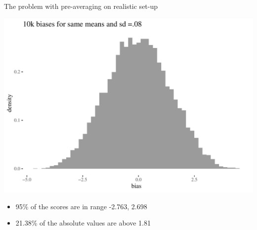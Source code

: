\documentclass[
  10pt,
  ignorenonframetext,
  x11names, dvipsnames, bibspacing,natbib, table]{beamer}
\providecommand{\tightlist}{%
  \setlength{\itemsep}{0pt}\setlength{\parskip}{0pt}}
\begin{document}
\begin{frame}{The problem with pre-averaging on realistic set-up}
\protect\hypertarget{the-problem-with-pre-averaging-on-realistic-set-up-1}{}
\vspace{1mm}
\footnotesize

\begin{center}\includegraphics[width=0.9\linewidth]{presentationBoston_files/figure-beamer/unnamed-chunk-12-1} \end{center}
\vspace{1mm}
\footnotesize

\normalsize
\pause

\footnotesize

\vspace{-2mm}

\begin{itemize}
\tightlist
\item
  95\% of the scores are in range -2.763, 2.698
\item
  21.38\% of the absolute values are above 1.81
\end{itemize}
\end{frame}
\end{document}
